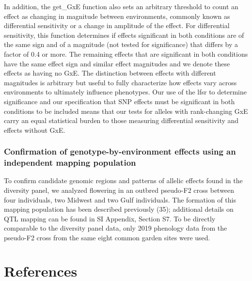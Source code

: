\documentclass[
  9pt,
  twocolumn,
  twoside]{pnas-new}
\begin{document}
In addition, the get\_GxE function also sets an arbitrary threshold to
count an effect as changing in magnitude between environments, commonly
known as differential sensitivity or a change in amplitude of the
effect. For differential sensitivity, this function determines if
effects significant in both conditions are of the same sign and of a
magnitude (not tested for significance) that differs by a factor of 0.4
or more. The remaining effects that are significant in both conditions
have the same effect sign and similar effect magnitudes and we denote
these effects as having no GxE. The distinction between effects with
different magnitudes is arbitrary but useful to fully characterize how
effects vary across environments to ultimately influence phenotypes. Our
use of the lfsr to determine significance and our specification that SNP
effects must be significant in both conditions to be included means that
our tests for alleles with rank-changing GxE carry an equal statistical
burden to those measuring differential sensitivity and effects without
GxE.

\subsubsection{Confirmation of genotype-by-environment effects using an
independent mapping
population}\label{confirmation-of-genotype-by-environment-effects-using-an-independent-mapping-population}

To confirm candidate genomic regions and patterns of allelic effects
found in the diversity panel, we analyzed flowering in an outbred
pseudo-F2 cross between four individuals, two Midwest and two Gulf
individuals. The formation of this mapping population has been described
previously (35); additional details on QTL mapping can be found in SI
Appendix, Section S7. To be directly comparable to the diversity panel
data, only 2019 phenology data from the pseudo-F2 cross from the same
eight common garden sites were used.

\section{References}\label{references}

\bibsplit[2]
\end{document}
